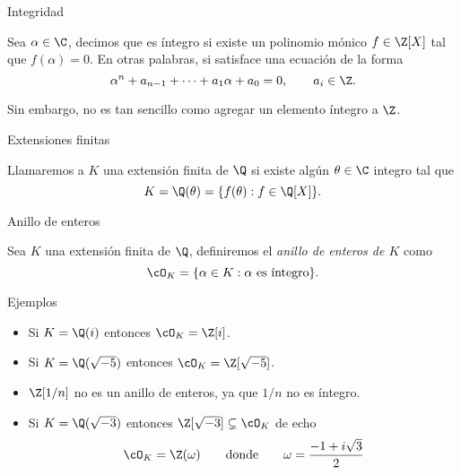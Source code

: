 \begin{frame}{Integridad}
  \begin{definition}
    Sea $\alpha \in \C$, decimos que es íntegro si existe un polinomio mónico $f \in \Z[X]$ tal que $f(\alpha) = 0$. En otras palabras, si satisface una ecuación de la forma
  \[
    \alpha^n + a_{n-1}+\cdots + a_1\alpha + a_0 = 0,\qquad a_i \in \Z.
  \]
  \end{definition}

  \pause\bigskip Sin embargo, no es tan sencillo como agregar un elemento íntegro a $\Z$.
\end{frame}


\begin{frame}{Extensiones finitas}
  \begin{definition}
    Llamaremos a $K$ una extensión finita de $\Q$ si existe algún $\theta \in \C$ integro tal que
  \[
    K = \Q(\theta) = \{f(\theta) : f \in\Q[X]\}.
  \]
  \end{definition}
\end{frame}



\begin{frame}{Anillo de enteros}
  \begin{definition}
    Sea $K$ una extensión finita de $\Q$, definiremos el \emph{anillo de enteros de $K$} como
    \[
      \cO_K = \{ \alpha \in K : \alpha \ \text{es íntegro} \}.
    \]
  \end{definition}
\end{frame}


\begin{frame}{Ejemplos}
  \begin{itemize}[<+->]
    \item Si $K = \Q(i)$ entonces $\cO_K = \Z[i]$.
    \bigskip
    
    \item Si $K = \Q(\sqrt{-5})$ entonces $\cO_K = \Z[\sqrt{-5}]$.
    \bigskip
    
    \item $\Z[1/n]$ no es un anillo de enteros, ya que $1/n$ no es íntegro.
    \bigskip

    \item Si $K = \Q(\sqrt{-3})$ entonces $\Z[\sqrt{-3}] \subsetneq \cO_K$ de echo
    \[
      \cO_K = \Z(\omega) \qquad\text{donde}\qquad \omega = \frac{-1+i\sqrt{3}}{2}
    \]
  \end{itemize}
\end{frame}


